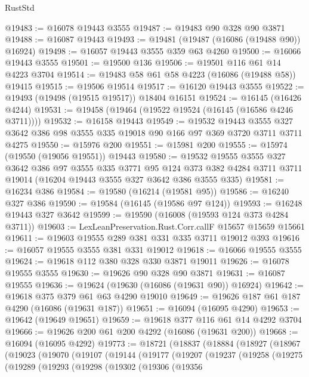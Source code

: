 \begin{lexlean}{RustStd}
\begin{coremodule}
@19483 := @16078 @19443 @3555
@19487 := @19483 @90 @328 @90 @3871
@19488 := @16087 @19443
@19493 := @19481 (@19487 (@16086 (@19488 @90)) @16924)
@19498 := @16057 @19443 @3555 @359 @63 @4260
@19500 := @16066 @19443 @3555
@19501 := @19500 @136
@19506 := @19501 @116 @61 @14 @4223 @3704
@19514 := @19483 @58 @61 @58 @4223 (@16086 (@19488 @58)) @19415
@19515 := @19506 @19514
@19517 := @16120 @19443 @3555
@19522 := @19493 (@19498 (@19515 @19517)) @18404 @16151
@19524 := @16145 (@16426 @4244)
@19531 := @19458 (@19464 (@19522 @19524 (@16145 (@16586 @4246 @3711))))
@19532 := @16158 @19443
@19549 := @19532
    @19443
    @3555
    @327
    @3642
    @386
    @98
    @3555
    @335
    @19018
    @90
    @166
    @97
    @369
    @3720
    @3711
    @3711
    @4275
@19550 := @15976 @200
@19551 := @15981 @200
@19555 := @15974 (@19550 (@19056 @19551)) @19443
@19580 := @19532
    @19555
    @3555
    @327
    @3642
    @386
    @97
    @3555
    @335
    @3771
    @95
    @124
    @373
    @382
    @4284
    @3711
    @3711
    @19014
    (@16204 @19443 @3555 @327 @3642 @386 @3555 @335)
@19581 := @16234 @386
@19584 := @19580 (@16214 (@19581 @95))
@19586 := @16240 @327 @386
@19590 := @19584 (@16145 (@19586 @97 @124))
@19593 := @16248 @19443 @327 @3642
@19599 := @19590 (@16008 (@19593 @124 @373 @4284 @3711))
@19603 := LexLeanPreservation.Rust.Corr.callF @15657 @15659 @15661
@19611 := @19603 @19555 @289 @381 @331 @335 @3711 @19012 @393
@19616 := @16057 @19555 @3555 @381 @331 @19012
@19618 := @16066 @19555 @3555
@19624 := @19618 @112 @380 @328 @330 @3871 @19011
@19626 := @16078 @19555 @3555
@19630 := @19626 @90 @328 @90 @3871
@19631 := @16087 @19555
@19636 := @19624 (@19630 (@16086 (@19631 @90)) @16924)
@19642 := @19618 @375 @379 @61 @63 @4290 @19010
@19649 := @19626 @187 @61 @187 @4290 (@16086 (@19631 @187))
@19651 := @16094 (@16095 @4290)
@19653 := @19642 (@19649 @19651)
@19659 := @19618 @377 @116 @61 @14 @4292 @3704
@19666 := @19626 @200 @61 @200 @4292 (@16086 (@19631 @200))
@19668 := @16094 (@16095 @4292)
@19773 := @18721
    (@18837
      (@18884
        (@18927
          (@18967
            (@19023
              (@19070
                (@19107
                  (@19144
                    (@19177
                      (@19207
                        (@19237
                          (@19258
                            (@19275
                              (@19289
                                (@19293
                                  (@19298
                                    (@19302
                                      (@19306
                                        (@19356

\end{coremodule}
\end{lexlean}
